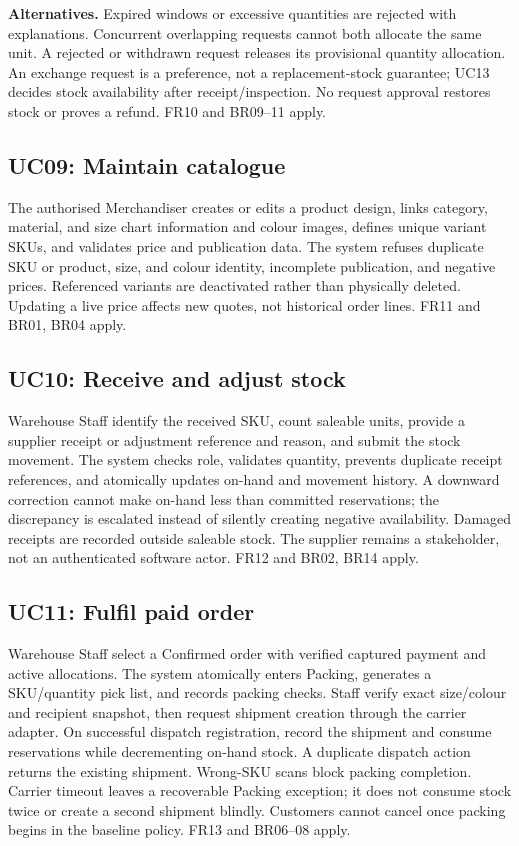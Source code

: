 \textbf{Alternatives.} Expired windows or excessive quantities are rejected with explanations. Concurrent overlapping requests cannot both allocate the same unit. A rejected or withdrawn request releases its provisional quantity allocation. An exchange request is a preference, not a replacement-stock guarantee; UC13 decides stock availability after receipt/inspection. No request approval restores stock or proves a refund. FR10 and BR09--11 apply.

\subsection{UC09: Maintain catalogue}
The authorised Merchandiser creates or edits a product design, links category, material, and size chart information and colour images, defines unique variant SKUs, and validates price and publication data. The system refuses duplicate SKU or product, size, and colour identity, incomplete publication, and negative prices. Referenced variants are deactivated rather than physically deleted. Updating a live price affects new quotes, not historical order lines. FR11 and BR01, BR04 apply.

\subsection{UC10: Receive and adjust stock}
Warehouse Staff identify the received SKU, count saleable units, provide a supplier receipt or adjustment reference and reason, and submit the stock movement. The system checks role, validates quantity, prevents duplicate receipt references, and atomically updates on-hand and movement history. A downward correction cannot make on-hand less than committed reservations; the discrepancy is escalated instead of silently creating negative availability. Damaged receipts are recorded outside saleable stock. The supplier remains a stakeholder, not an authenticated software actor. FR12 and BR02, BR14 apply.

\subsection{UC11: Fulfil paid order}
Warehouse Staff select a Confirmed order with verified captured payment and active allocations. The system atomically enters Packing, generates a SKU/quantity pick list, and records packing checks. Staff verify exact size/colour and recipient snapshot, then request shipment creation through the carrier adapter. On successful dispatch registration, record the shipment and consume reservations while decrementing on-hand stock. A duplicate dispatch action returns the existing shipment. Wrong-SKU scans block packing completion. Carrier timeout leaves a recoverable Packing exception; it does not consume stock twice or create a second shipment blindly. Customers cannot cancel once packing begins in the baseline policy. FR13 and BR06--08 apply.

